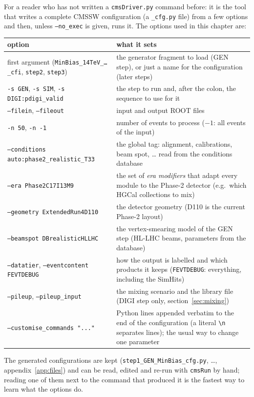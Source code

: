 \documentclass[11pt,a4paper]{article}
\newcommand{\code}[1]{\texttt{#1}}
\begin{document}
For a reader who has not written a \code{cmsDriver.py} command before: it is the tool that writes a complete
CMSSW configuration (a \code{\_cfg.py} file) from a few options and then, unless \code{--no\_exec} is given,
runs it. The options used in this chapter are:
\begin{center}\small
\begin{tabularx}{\textwidth}{>{\raggedright\arraybackslash}p{54mm}X}
\toprule
option & what it sets \\
\midrule
first argument (\code{MinBias\_14TeV\_\ldots\_cfi}, \code{step2}, \code{step3}) & the generator fragment to
  load (GEN step), or just a name for the configuration (later steps) \\
\code{-s GEN}, \code{-s SIM}, \code{-s DIGI:pdigi\_valid} & the step to run and, after the colon, the
  sequence to use for it \\
\code{--filein}, \code{--fileout} & input and output ROOT files \\
\code{-n 50}, \code{-n -1} & number of events to process ($-1$: all events of the input) \\
\code{--conditions auto:phase2\_realistic\_T33} & the global tag: alignment, calibrations, beam spot, \ldots{}
  read from the conditions database \\
\code{--era Phase2C17I13M9} & the set of \emph{era modifiers} that adapt every module to the Phase-2 detector
  (e.g.\ which HGCal collections to mix) \\
\code{--geometry ExtendedRun4D110} & the detector geometry (D110 is the current Phase-2 layout) \\
\code{--beamspot DBrealisticHLLHC} & the vertex-smearing model of the GEN step (HL-LHC beams, parameters
  from the database) \\
\code{--datatier}, \code{--eventcontent FEVTDEBUG} & how the output is labelled and which products it keeps
  (\code{FEVTDEBUG}: everything, including the SimHits) \\
\code{--pileup}, \code{--pileup\_input} & the mixing scenario and the library file (DIGI step only,
  section~\ref{sec:mixing}) \\
\code{--customise\_commands "..."} & Python lines appended verbatim to the end of the configuration
  (a literal \code{\textbackslash n} separates lines); the usual way to change one parameter \\
\bottomrule
\end{tabularx}
\end{center}
The generated configurations are kept (\code{step1\_GEN\_MinBias\_cfg.py}, \ldots, appendix~\ref{app:files})
and can be read, edited and re-run with \code{cmsRun} by hand; reading one of them next to the command that
produced it is the fastest way to learn what the options do.
\end{document}
